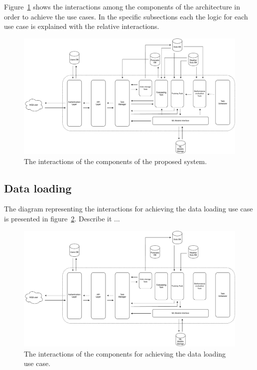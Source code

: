 Figure~\ref{fig:interactions} shows the interactions among the components of the architecture in order to achieve the use cases.
In the specific subsections each the logic for each use case is explained with the relative interactions.

\begin{figure}[H]
\centering 
\includegraphics[width=1\textwidth]{images/architecture_interactions}
\caption{The interactions of the components of the proposed system.}
\label{fig:interactions}
\end{figure}


\vspace{0.1 cm}
\subsection{Data loading}
\label{sec:loading}
\vspace{0.1 cm}

The diagram representing the interactions for achieving the data loading use case is presented in figure~\ref{fig:loadinginteractions}.
Describe it ...

\begin{figure}[H]
\centering 
\includegraphics[width=1\textwidth]{images/architecture_data_loading_interactions}
\caption{The interactions of the components for achieving the data loading use case.}
\label{fig:loadinginteractions}
\end{figure}

